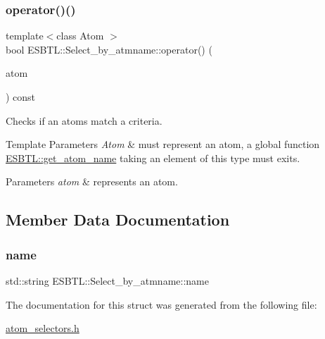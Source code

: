 \subsubsection{\texorpdfstring{operator()()}{operator()()}}
{\footnotesize\ttfamily template$<$class Atom $>$ \\
bool E\+S\+B\+T\+L\+::\+Select\+\_\+by\+\_\+atmname\+::operator() (\begin{DoxyParamCaption}\item[{const Atom \&}]{atom }\end{DoxyParamCaption}) const\hspace{0.3cm}{\ttfamily [inline]}}

Checks if an atoms match a criteria. 
\begin{DoxyTemplParams}{Template Parameters}
{\em Atom} & must represent an atom, a global function \hyperlink{namespaceESBTL_a2a0153bcc07ae7f992d0087ea0574b2a}{E\+S\+B\+T\+L\+::get\+\_\+atom\+\_\+name} taking an element of this type must exits. \\
\hline
\end{DoxyTemplParams}

\begin{DoxyParams}{Parameters}
{\em atom} & represents an atom. \\
\hline
\end{DoxyParams}


\subsection{Member Data Documentation}
\mbox{\label{structESBTL_1_1Select__by__atmname_ac038c0e310fe3213c6ced27fadc5cf8a}} 
\subsubsection{\texorpdfstring{name}{name}}
{\footnotesize\ttfamily std\+::string E\+S\+B\+T\+L\+::\+Select\+\_\+by\+\_\+atmname\+::name}



The documentation for this struct was generated from the following file\+:\begin{DoxyCompactItemize}
\item 
\hyperlink{atom__selectors_8h}{atom\+\_\+selectors.\+h}\end{DoxyCompactItemize}
